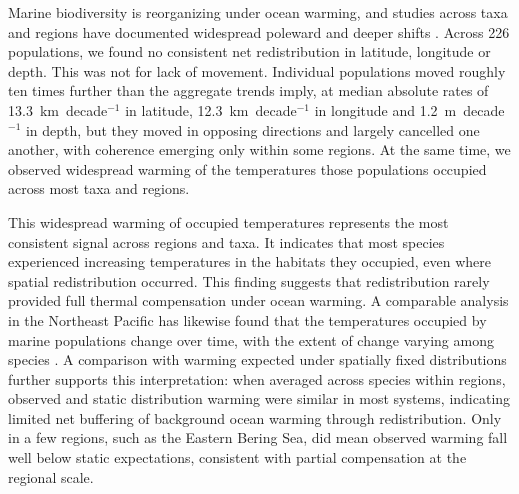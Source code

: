 \documentclass[9pt,twocolumn,twoside]{pnas-new}
\begin{document}
Marine biodiversity is reorganizing under ocean warming, and studies across taxa and regions have documented widespread poleward and deeper shifts \citep{poloczanska_global_2013, dulvy_climate_2008, poloczanska_responses_2016, perry_climate_2005}. Across 226 populations, we found no consistent net redistribution in latitude, longitude or depth. This was not for lack of movement. Individual populations moved roughly ten times further than the aggregate trends imply, at median absolute rates of 13.3~km~decade$^{-1}$ in latitude, 12.3~km~decade$^{-1}$ in longitude and 1.2~m~decade$^{-1}$ in depth, but they moved in opposing directions and largely cancelled one another, with coherence emerging only within some regions. At the same time, we observed widespread warming of the temperatures those populations occupied across most taxa and regions.

This widespread warming of occupied temperatures represents the most consistent signal across regions and taxa. It indicates that most species experienced increasing temperatures in the habitats they occupied, even where spatial redistribution occurred. This finding suggests that redistribution rarely provided full thermal compensation under ocean warming. A comparable analysis in the Northeast Pacific has likewise found that the temperatures occupied by marine populations change over time, with the extent of change varying among species \citep{ward_win_2024}. A comparison with warming expected under spatially fixed distributions further supports this interpretation: when averaged across species within regions, observed and static distribution warming were similar in most systems, indicating limited net buffering of background ocean warming through redistribution. Only in a few regions, such as the Eastern Bering Sea, did mean observed warming fall well below static expectations, consistent with partial compensation at the regional scale.
\end{document}
